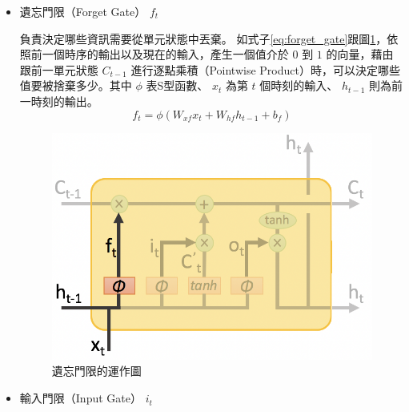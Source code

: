 \begin{itemize}
\item{遺忘門限（Forget Gate） $ f_t $ }
	
	負責決定哪些資訊需要從單元狀態中丟棄。
	如式子\ref{eq:forget_gate}跟圖\ref{fig:ch2_forget_gate}，依照前一個時序的輸出以及現在的輸入，產生一個值介於 $ 0 $ 到 $ 1 $ 的向量，藉由跟前一單元狀態 $ C_{t-1} $ 進行逐點乘積（Pointwise
	Product）時，可以決定哪些值要被捨棄多少。其中 $ \phi $ 表S型函數、 $ x_t $ 為第 $ t $ 個時刻的輸入、 $ h_{t-1} $ 則為前一時刻的輸出。
\begin{equation}
\label{eq:forget_gate}
f_t =  \phi( W_{xf} x_t + W_{hf} h_{t-1}+b_f)
\end{equation}
\begin{figure}[ht]
\centering
\includegraphics[scale=0.5]{images/ch2_forget_gate.png}
\caption{遺忘門限的運作圖\cite{shen2016}} \label{fig:ch2_forget_gate}
\end{figure}
\item{輸入門限（Input Gate） $ i_t $ } 


\end{itemize}
